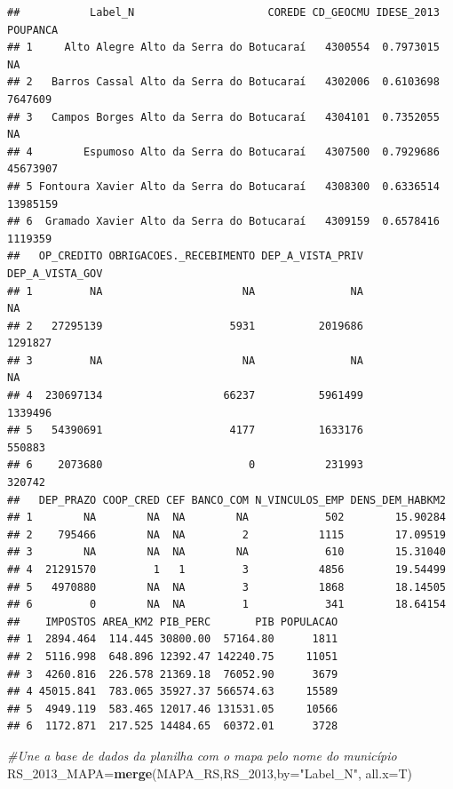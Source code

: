 \documentclass[12pt,brazil,]{book}
\newenvironment{Shaded}{\begin{snugshade}}{\end{snugshade}}
\newcommand{\CommentTok}[1]{\textcolor[rgb]{0.56,0.35,0.01}{\textit{#1}}}
\newcommand{\DataTypeTok}[1]{\textcolor[rgb]{0.13,0.29,0.53}{#1}}
\newcommand{\DecValTok}[1]{\textcolor[rgb]{0.00,0.00,0.81}{#1}}
\newcommand{\KeywordTok}[1]{\textcolor[rgb]{0.13,0.29,0.53}{\textbf{#1}}}
\newcommand{\NormalTok}[1]{#1}
\newcommand{\StringTok}[1]{\textcolor[rgb]{0.31,0.60,0.02}{#1}}
\begin{document}
\begin{verbatim}
##           Label_N                     COREDE CD_GEOCMU IDESE_2013 POUPANCA
## 1     Alto Alegre Alto da Serra do Botucaraí   4300554  0.7973015       NA
## 2   Barros Cassal Alto da Serra do Botucaraí   4302006  0.6103698  7647609
## 3   Campos Borges Alto da Serra do Botucaraí   4304101  0.7352055       NA
## 4        Espumoso Alto da Serra do Botucaraí   4307500  0.7929686 45673907
## 5 Fontoura Xavier Alto da Serra do Botucaraí   4308300  0.6336514 13985159
## 6  Gramado Xavier Alto da Serra do Botucaraí   4309159  0.6578416  1119359
##   OP_CREDITO OBRIGACOES._RECEBIMENTO DEP_A_VISTA_PRIV DEP_A_VISTA_GOV
## 1         NA                      NA               NA              NA
## 2   27295139                    5931          2019686         1291827
## 3         NA                      NA               NA              NA
## 4  230697134                   66237          5961499         1339496
## 5   54390691                    4177          1633176          550883
## 6    2073680                       0           231993          320742
##   DEP_PRAZO COOP_CRED CEF BANCO_COM N_VINCULOS_EMP DENS_DEM_HABKM2
## 1        NA        NA  NA        NA            502        15.90284
## 2    795466        NA  NA         2           1115        17.09519
## 3        NA        NA  NA        NA            610        15.31040
## 4  21291570         1   1         3           4856        19.54499
## 5   4970880        NA  NA         3           1868        18.14505
## 6         0        NA  NA         1            341        18.64154
##    IMPOSTOS AREA_KM2 PIB_PERC       PIB POPULACAO
## 1  2894.464  114.445 30800.00  57164.80      1811
## 2  5116.998  648.896 12392.47 142240.75     11051
## 3  4260.816  226.578 21369.18  76052.90      3679
## 4 45015.841  783.065 35927.37 566574.63     15589
## 5  4949.119  583.465 12017.46 131531.05     10566
## 6  1172.871  217.525 14484.65  60372.01      3728
\end{verbatim}

\begin{Shaded}
\begin{Highlighting}[]
\CommentTok{#Une a base de dados da planilha com o mapa pelo nome do município}
\NormalTok{RS_}\DecValTok{2013}\NormalTok{_MAPA=}\KeywordTok{merge}\NormalTok{(MAPA_RS,RS_}\DecValTok{2013}\NormalTok{,}\DataTypeTok{by=}\StringTok{"Label_N"}\NormalTok{, }\DataTypeTok{all.x=}\NormalTok{T) }
\end{Highlighting}
\end{Shaded}
\end{document}

